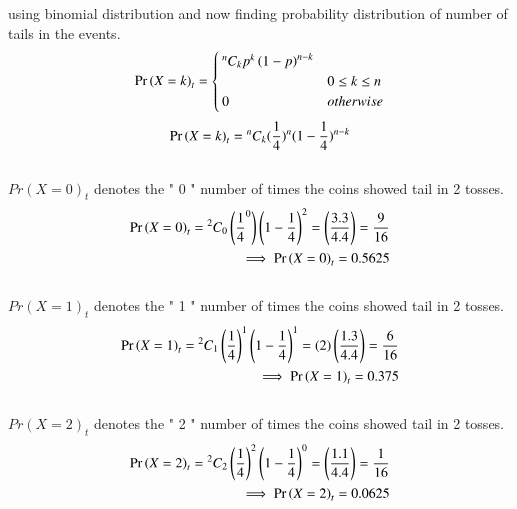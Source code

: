 \documentclass[journal,14pt,twocolumn]{IEEEtran}
\begin{document}
  using  binomial distribution and now finding probability distribution of number of tails in the events.\\
  \begin{align}\label{equation-1}
   \Pr\left(X=k\right)_t =
  \begin{cases}
    {^n C_k}p^{k}\left(1-p\right)^{n-k} \\& 0 \leq k \leq n\\
      0 & otherwise
  \end{cases}
 \end{align}
\begin{equation}
\Pr\left(X=k\right)_t={^n C_k}( \frac{1}{4})^{n} (1-\frac{1}{4}) ^{n-k}
\end{equation}\\

$Pr(X=0)_t $ denotes the " 0 " number of times the coins showed tail in 2 tosses.\\
\begin{align}
 \Pr\left(X=0\right)_t={^2 C_0}\left( \frac{1}{4}^{0}\right) \left(1-\frac{1}{4}\right) ^{2}=\left(\frac{3.3}{4.4}\right)=\frac{9}{16}\\
 \implies \Pr\left(X=0\right)_t=0.5625 \nonumber
 \end{align}
\\$Pr(X=1)_t $ denotes the " 1 " number of times the coins showed tail in 2 tosses.\\
\begin{align}
\Pr\left(X=1\right)_t={{^2 C_1}\left(\frac{1}{4}\right)^{1} \left(1-\frac{1}{4}\right) ^{1}=(2)\left(\frac{1.3}{4.4}\right)}=\frac{6}{16}\\
\implies \Pr\left(X=1\right)_t=0.375 \nonumber
 \end{align}
\\$Pr(X=2)_t $ denotes the " 2 " number of times the coins showed tail in 2 tosses.\\
\begin{align}
\Pr\left(X=2\right)_t={^2 C_2}\left( \frac{1}{4}\right)^{2} \left(1-\frac{1}{4}\right)^{0}=\left(\frac{1.1}{4.4}\right)=\frac{1}{16}\\
 \implies \Pr\left(X=2\right)_t=0.0625 \nonumber
 \end{align}
\begin{table}[h]
\\
\caption{Outcome of the Experiment} 

\end{table}
\end{document}
